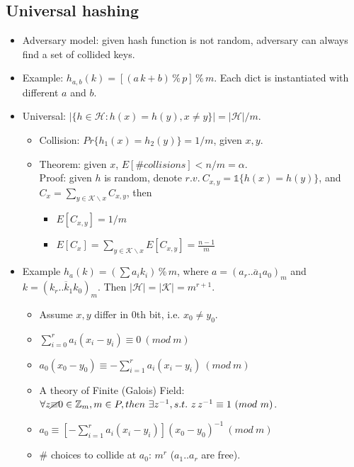 \documentclass[twocolumn]{article}
\begin{document}
\subsection{Universal hashing}
\begin{itemize}
\item Adversary model: given hash function is not random, adversary can always find a set of collided keys.
\item Example: $h_{a,b}(k) = [(a\,k+b)\,\%\, p]\,\%\,m$. Each dict is instantiated with different $a$ and $b$.
\item Universal: $|\{h \in \mathcal{H} : h(x) = h(y), x \neq y\}| = |\mathcal{H}|/m$.
  \begin{itemize}
  \item Collision: ${Pr}\{h_1(x)=h_2(y)\} = 1/m$, given $x, y$. 
  \item Theorem: given $x$, $E[\#collisions] < n/m = \alpha$.\\
  Proof: given $h$ is random, denote $r.v.\ C_{x,y} = \mathbb{1}\{h(x)=h(y)\}$, and $C_{x} = \sum_{y \in \mathcal{K}\backslash x} C_{x,y}$, then
    \begin{itemize}
    \item $E[C_{x,y}] = 1/m$
    \item $E[C_x] = \sum_{y \in \mathcal{K} \backslash x} E[C_{x,y}] = \frac{n-1}{m}$
    \end{itemize}
  \end{itemize}
\item Example $h_a(k) = (\sum a_i k_i)\,\%\,m$, where $a=(\overline{a_r..a_1a_0})_m$ and $k = (\overline{k_r..k_1k_0})_m$. Then $|\mathcal{H}| = |\mathcal{K}| = m^{r+1}$.
  \begin{itemize}
  \item Assume $x,y$ differ in $0$th bit, i.e. $x_0 \neq y_0$.
  \item $\sum_{i=0}^r a_i (x_i - y_i) \equiv 0\ (mod\ m)$
  \item $a_0(x_0 - y_0) \equiv -\sum_{i=1}^r a_i (x_i - y_i)\ (mod\ m)$
  \item A theory of Finite (Galois) Field: $\forall z \cancel{\equiv} 0 \in \mathbb{Z}_m, m \in P, then\ \exists z^{-1}, s.t.\ z\,z^{-1} \equiv 1\ (mod\ m)$.
  \item $a_0 \equiv [- \sum_{i=1}^r a_i (x_i - y_i)] (x_0 - y_0)^{-1}\ (mod\ m)$
  \item \# choices to collide at $a_0$: $m^r$ ($a_1..a_r$ are free).
  \end{itemize}
\end{itemize}
\end{document}
